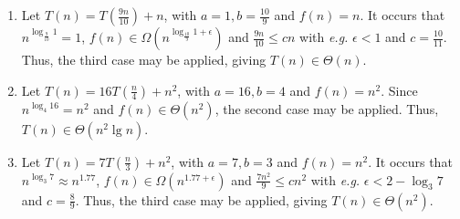 \documentclass[12pt]{article}
\begin{document}
\begin{enumerate}
\begin{enumerate}
    \item Let $T(n) = T(\frac{9n}{10}) + n$, with $a = 1, b = \frac{10}{9}$ and $f(n) = n$. It occurs that $n^{\log_{\frac{9}{10}} 1} = 1$, $f(n) \in \Omega(n^{\log_{\frac{10}{9}} 1 + \epsilon})$ and $\frac{9n}{10} \leq cn$ with \emph{e.g.} $\epsilon < 1$ and $c = \frac{10}{11}$. Thus, the third case may be applied, giving $T(n) \in \Theta(n)$.
    
    \item Let $T(n) = 16T(\frac{n}{4}) + n^{2}$, with $a = 16, b = 4$ and $f(n) = n^{2}$. Since $n^{\log_{4} 16} = n^{2}$ and $f(n) \in \Theta(n^{2})$, the second case may be applied. Thus, $T(n) \in \Theta(n^{2} \lg n)$.
    
    \item Let $T(n) = 7T(\frac{n}{3}) + n^{2}$, with $a = 7, b = 3$ and $f(n) = n^{2}$. It occurs that $n^{\log_{3} 7} \approx n^{1.77}$, $f(n) \in \Omega(n^{1.77 + \epsilon})$ and $\frac{7n^{2}}{9} \leq cn^{2}$ with \emph{e.g.} $\epsilon < 2 - \log_3 7$ and $c = \frac{8}{9}$. Thus, the third case may be applied, giving $T(n) \in \Theta(n^{2})$.
  \end{enumerate}
  

\end{enumerate}
\end{document}
